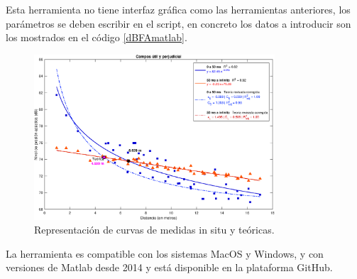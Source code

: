 \newpage
Esta herramienta no tiene interfaz gráfica como las herramientas anteriores, los parámetros se deben escribir en el script, en concreto los datos a introducir son los mostrados en el código \ref{dBFAmatlab}.

\begin{figure}[ht]
    \centering
    \includegraphics[width=0.8\textwidth]{archivos/capturas/dbfamatlab}
    \caption{Representación de curvas de medidas in situ y teóricas.}
\end{figure}
\FloatBarrier

La herramienta es compatible con los sistemas MacOS y Windows, y con versiones de Matlab desde 2014 y está disponible en la plataforma GitHub.














